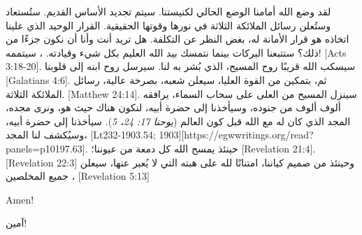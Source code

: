 لقد وضع الله أمامنا الوضع الحالي لكنيستنا. سيتم تجديد الأساس القديم. ستُستعاد  وستُعلن رسائل الملائكة الثلاثة في نورها وقوتها الحقيقية. القرار الوحيد الذي علينا اتخاذه هو قرار الأمانة له، بغض النظر عن التكلفة. هل تريد أنت وأنا أن نكون جزءًا من ذلك؟ ستتبعنا البركات بينما نتمسك بيد الله العليم بكل شيء وقيادته. ، سيتممه! [Acts 3:18-20]. سيسكب الله قريبًا روح المسيح، الذي بُشر به لنا. سيرسل روح ابنه إلى قلوبنا [Galatians 4:6]. ثم، بتمكين من القوة العليا، سيعلن شعبه، بصرخة عالية، رسائل الملائكة الثلاثة. [Matthew 24:14]. سينزل المسيح من العلى على سحاب السماء، يرافقه ألوف ألوف من جنوده، وسيأخذنا إلى حضرة أبيه، لنكون هناك حيث هو، ونرى مجده، المجد الذي كان له مع الله قبل كون العالم (\textit{يوحنا 17: 24، 5}). سيأخذنا إلى حضرة أبيه، وسيُكشف لنا المجد، [Lt232-1903.54; 1903][https://egwwritings.org/read?panels=p10197.63]. حينئذ يمسح الله كل دمعة من عيوننا؛ [Revelation 21:4]. [Revelation 22:3] وحينئذ من صميم كياننا، امتنانًا لله على هبته التي لا يُعبر عنها، سيعلن جميع المخلصين ، [Revelation 5:13]


Amen!


آمين!



